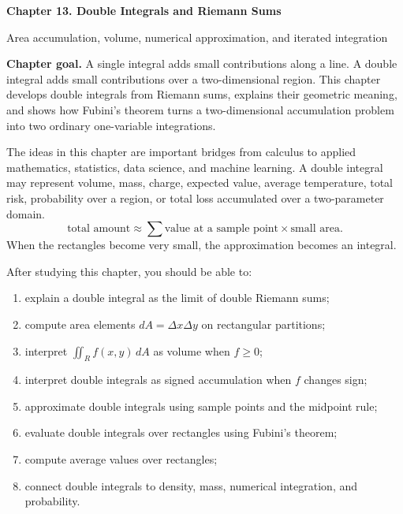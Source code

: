 \documentclass[11pt]{article}
\newcommand{\dA}{\,dA}
\begin{document}
\begin{center}
  {\LARGE\bfseries Chapter 13. Double Integrals and Riemann Sums\par}
  \vspace{0.3em}
  {\large Area accumulation, volume, numerical approximation, and iterated integration\par}
\end{center}

\begin{chaptergoalbox}
\textbf{Chapter goal.} A single integral adds small contributions along a line. A double integral adds small contributions over a two-dimensional region. This chapter develops double integrals from Riemann sums, explains their geometric meaning, and shows how Fubini's theorem turns a two-dimensional accumulation problem into two ordinary one-variable integrations.

The ideas in this chapter are important bridges from calculus to applied mathematics, statistics, data science, and machine learning. A double integral may represent volume, mass, charge, expected value, average temperature, total risk, probability over a region, or total loss accumulated over a two-parameter domain.
\[
\text{total amount}\approx \sum \text{value at a sample point}\times \text{small area}.
\]
When the rectangles become very small, the approximation becomes an integral.
\end{chaptergoalbox}

\begin{goalbox}
After studying this chapter, you should be able to:
\begin{enumerate}
  \item explain a double integral as the limit of double Riemann sums;
  \item compute area elements $dA=\Delta x\Delta y$ on rectangular partitions;
  \item interpret $\iint_R f(x,y)\dA$ as volume when $f\ge 0$;
  \item interpret double integrals as signed accumulation when $f$ changes sign;
  \item approximate double integrals using sample points and the midpoint rule;
  \item evaluate double integrals over rectangles using Fubini's theorem;
  \item compute average values over rectangles;
  \item connect double integrals to density, mass, numerical integration, and probability.
\end{enumerate}
\end{goalbox}
\end{document}
